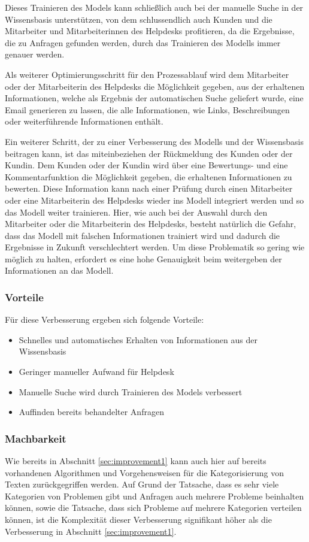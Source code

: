 Dieses Trainieren des Models kann schließlich auch bei der manuelle Suche in der Wissensbasis unterstützen, von dem schlussendlich auch Kunden und die Mitarbeiter und Mitarbeiterinnen des Helpdesks profitieren, da die Ergebnisse, die zu Anfragen gefunden werden, durch das Trainieren des Modells immer genauer werden.

Als weiterer Optimierungsschritt für den Prozessablauf wird dem Mitarbeiter oder der Mitarbeiterin des Helpdesks die Möglichkeit gegeben, aus der erhaltenen Informationen, welche als Ergebnis der automatischen Suche geliefert wurde, eine Email generieren zu lassen, die alle Informationen, wie Links, Beschreibungen oder weiterführende Informationen enthält.

Ein weiterer Schritt, der zu einer Verbesserung des Modells und der Wissensbasis beitragen kann, ist das miteinbeziehen der Rückmeldung des Kunden oder der Kundin. Dem Kunden oder der Kundin wird über eine Bewertungs- und eine Kommentarfunktion die Möglichkeit gegeben, die erhaltenen Informationen zu bewerten. Diese Information kann nach einer Prüfung durch einen Mitarbeiter oder eine Mitarbeiterin des Helpdesks wieder ins Modell integriert werden und so das Modell weiter trainieren. Hier, wie auch bei der Auswahl durch den Mitarbeiter oder die Mitarbeiterin des Helpdesks, besteht natürlich die Gefahr, dass das Modell mit falschen Informationen trainiert wird und dadurch die Ergebnisse in Zukunft verschlechtert werden. Um diese Problematik so gering wie möglich zu halten, erfordert es eine hohe Genauigkeit beim weitergeben der Informationen an das Modell.


\subsubsection{Vorteile}
Für diese Verbesserung ergeben sich folgende Vorteile:

\begin{itemize}
	\item Schnelles und automatisches Erhalten von Informationen aus der Wissensbasis
	\item Geringer manueller Aufwand für Helpdesk
	\item Manuelle Suche wird durch Trainieren des Models verbessert
	\item Auffinden bereits behandelter Anfragen
\end{itemize}

\subsubsection{Machbarkeit}
Wie bereits in Abschnitt \ref{sec:improvement1} kann auch hier auf bereits vorhandenen Algorithmen und Vorgehensweisen für die Kategorisierung von Texten zurückgegriffen werden. Auf Grund der Tatsache, dass es sehr viele Kategorien von Problemen gibt und Anfragen auch mehrere Probleme beinhalten können, sowie die Tatsache, dass sich Probleme auf mehrere Kategorien verteilen können, ist die Komplexität dieser Verbesserung signifikant höher als die Verbesserung in Abschnitt \ref{sec:improvement1}.

